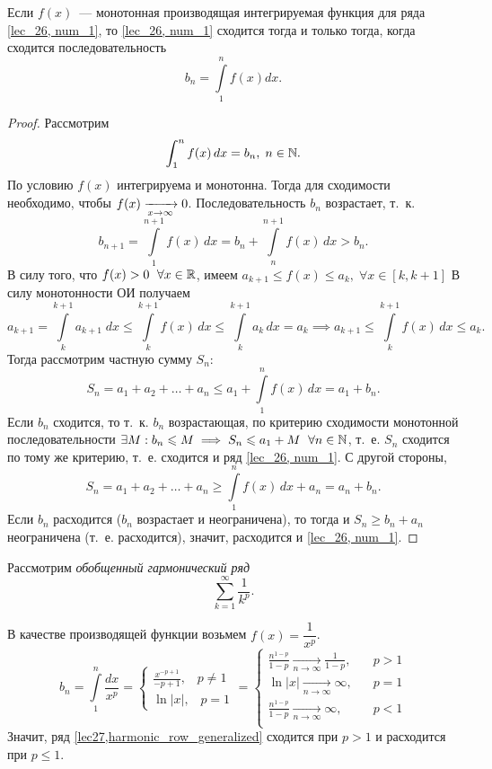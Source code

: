 \documentclass[../../main.tex]{subfiles}
\begin{document}
	\begin{thm} \label{lec27,integral_att}
		Если $f(x)$~--- монотонная производящая интегрируемая функция для ряда 
		\eqref{lec_26, num_1}, то \eqref{lec_26, num_1} сходится тогда и только 
		тогда, когда сходится последовательность \[b_n = \int\limits_1^n f(x)dx.\]
		\begin{proof}
			Рассмотрим
			\[ \int_{1}^{n} f(x) \, dx = b_n , \; n \in \mathbb{N}.  \]
			По условию $f(x)$ интегрируема и монотонна. Тогда для сходимости 
			необходимо, чтобы $f(x) \xrightarrow[x\to\infty]{}0$.
			Последовательность $b_n$ возрастает, т.~к.
			\[ b_{n+1} = \int\limits_{1}^{n+1} f(x) \, dx  = b_n + 
			\int\limits_{n}^{n+1} f(x) \, dx > 
			b_n. \]
			В силу того, что $f(x) > 0 \ \; \forall x \in \mathbb{R}$,
			имеем $a_{k+1} \le f(x) \le a_k, \; \forall x \in [k,k+1]$
			В силу монотонности ОИ получаем
			\[ a_{k+1} = \int\limits_{k}^{k+1}a_{k+1} \; dx  \le 
			\int\limits_{k}^{k+1}f(x) \, dx \le 
			\int\limits_{k}^{k+1}a_{k} \, dx  = a_{k} \implies a_{k+1} \le 
			\int\limits_{k}^{k+1}f(x) \, dx \le a_k. \]
			Тогда рассмотрим частную сумму $S_n$:
			\[ S_n = a_1 + a_2 + \dots + a_n \le a_1 +  \int\limits_{1}^{n}f(x) \, dx  
			= a_1 + 
			b_n. \]
			Если $b_n$ сходится, то т.~к. $b_n$ возрастающая, по критерию сходимости 
			монотонной последовательности $\exists M : b_n \leqslant M \implies S_n \leqslant a_1 + 
			M \ \; 
			\forall n \in \mathbb{N}$, т.~е. $S_n$ сходится по тому же критерию, т.~е. сходится 
			и ряд \eqref{lec_26, num_1}. С другой стороны,
			\[ S_n = a_1 + a_2 + \dots + a_n \ge \int\limits_{1}^{n}f(x) \, dx  + a_n = 
			a_n + b_n. \]
			Если $b_n$ расходится ($b_n$ возрастает и неограничена), то тогда и $S_n 
			\ge 
			b_n + a_n$ неограничена (т.~е. расходится), значит, расходится и 
			\eqref{lec_26, num_1}.
		\end{proof}
	\end{thm}

	\begin{iex} Рассмотрим \emph{обобщенный гармонический ряд}
		\begin{equation}  \sum_{k = 1}^{\infty} \frac{1}{k^p}. 
		\label{lec27,harmonic_row_generalized}  \end{equation}
		
		В качестве производящей функции возьмем $f(x) = \dfrac{1}{x^p}$.
		\[ b_n = \int\limits_{1}^{n} \frac{dx}{x^p} = \begin{cases} \frac{x^{-p + 
		1}}{-p + 
		1} , \; \;\; p \ne 1  \\  \ln{|x|}, \; \; \; p = 1 \end{cases} =  
		\begin{cases} \frac{n^{1-p}}{1-p } \underset{n \rightarrow \infty}
		{\longrightarrow} \frac{1}{1-p} ,& \; \;\; p > 1  \\  \ln{|x|} \underset{n 
		\rightarrow \infty}
		{\longrightarrow} \infty ,& \; \; \; p = 1 \\
		\frac{n^{1-p}}{1-p } \underset{n \rightarrow \infty}
		{\longrightarrow} \infty ,& \; \;\; p < 1  \\
		\end{cases} \]
		Значит, ряд \eqref{lec27,harmonic_row_generalized} 
		сходится при $p>1$ и расходится при $p \le 1$.
		\end{iex}
		
\end{document}

